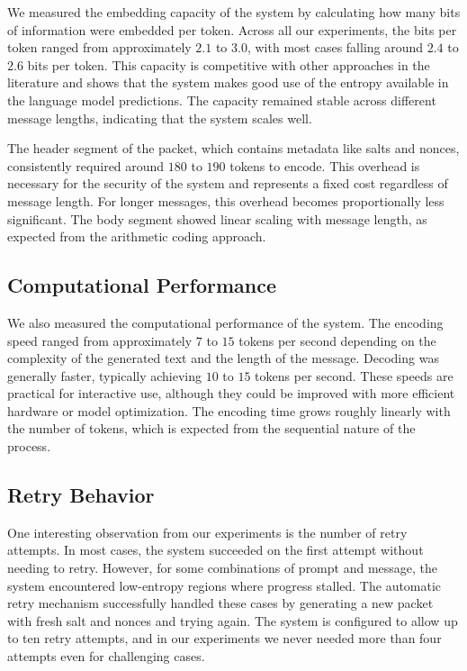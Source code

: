 \documentclass[sigconf,review,anonymous]{acmart}
\begin{document}
{We measured the embedding capacity of the system by calculating how many bits of information were embedded per token. Across all our experiments, the bits per token ranged from approximately $2.1$ to $3.0$, with most cases falling around $2.4$ to $2.6$ bits per token. This capacity is competitive with other approaches in the literature and shows that the system makes good use of the entropy available in the language model predictions. The capacity remained stable across different message lengths, indicating that the system scales well.

The header segment of the packet, which contains metadata like salts and nonces, consistently required around $180$ to $190$ tokens to encode. This overhead is necessary for the security of the system and represents a fixed cost regardless of message length. For longer messages, this overhead becomes proportionally less significant. The body segment showed linear scaling with message length, as expected from the arithmetic coding approach.

\subsection{Computational Performance}

We also measured the computational performance of the system. The encoding speed ranged from approximately $7$ to $15$ tokens per second depending on the complexity of the generated text and the length of the message. Decoding was generally faster, typically achieving $10$ to $15$ tokens per second. These speeds are practical for interactive use, although they could be improved with more efficient hardware or model optimization. The encoding time grows roughly linearly with the number of tokens, which is expected from the sequential nature of the process.

\subsection{Retry Behavior}

One interesting observation from our experiments is the number of retry attempts. In most cases, the system succeeded on the first attempt without needing to retry. However, for some combinations of prompt and message, the system encountered low-entropy regions where progress stalled. The automatic retry mechanism successfully handled these cases by generating a new packet with fresh salt and nonces and trying again. The system is configured to allow up to ten retry attempts, and in our experiments we never needed more than four attempts even for challenging cases.

}
\end{document}
